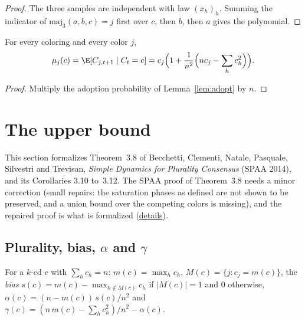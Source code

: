 \begin{proof}
  The three samples are independent with law $(x_h)_h$. Summing the
  indicator of $\mathrm{maj}_3(a,b,c) = j$ first over $c$, then $b$, then $a$
  gives the polynomial.
\end{proof}

\begin{lemma}\label{lem:2_1}
  \leanok
  For every coloring and every color $j$,
  \[
    \mu_j(c) = \E[C_{j,t+1} \mid C_t = c]
      = c_j\Bigl(1 + \frac{1}{n^2}\Bigl(n c_j - \sum_h c_h^2\Bigr)\Bigr).
  \]
\end{lemma}

\begin{proof}
  Multiply the adoption probability of Lemma~\ref{lem:adopt} by $n$.
\end{proof}

\section{The upper bound}\label{sec:upper}

This section formalizes Theorem~3.8 of Becchetti, Clementi, Natale, Pasquale, Silvestri and
Trevisan, \emph{Simple Dynamics for Plurality Consensus} (SPAA 2014), and its Corollaries 3.10
to~3.12. The SPAA proof of Theorem~3.8 needs a minor correction (small repairs: the saturation
phases as defined are not shown to be preserved, and a union bound over the competing colors is
missing), and the repaired proof is what is formalized
(\href{https://github.com/formal-dynamics/leanamics/blob/main/plurality/FORMALIZATION_DIFFERENCES.md#1-theorem-38-how-the-lean-proof-differs-from-spaa}{details}).

\subsection{Plurality, bias, \texorpdfstring{$\alpha$}{alpha} and \texorpdfstring{$\gamma$}{gamma}}

\begin{definition}\label{def:quantities}
  \leanok
  For a $k$-cd $c$ with $\sum_h c_h = n$: $m(c) = \max_h c_h$,
  $M(c) = \{j : c_j = m(c)\}$, the \emph{bias}
  $s(c) = m(c) - \max_{h \notin M(c)} c_h$ if $|M(c)| = 1$ and $0$ otherwise,
  $\alpha(c) = (n - m(c))\,s(c)/n^2$ and
  $\gamma(c) = (n\,m(c) - \sum_h c_h^2)/n^2 - \alpha(c)$.
\end{definition}

